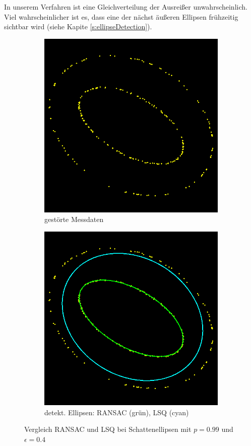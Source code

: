 In unserem Verfahren ist eine Gleichverteilung der Ausreißer unwahrscheinlich. Viel wahrscheinlicher ist es, dass eine der nächst äußeren Ellipsen frühzeitig sichtbar wird (siehe Kapite \ref{s:ellipseDetection}). 

\begin{figure}[!htb]
	\begin{subfigure}{.5\textwidth}
		\centering
		\includegraphics[width=.9\textwidth]{images/ransacShadow40_0.png}
		\caption{gestörte Messdaten}
	\end{subfigure}%
	\begin{subfigure}{.5\textwidth}
		\centering
		\includegraphics[width=.9\textwidth]{images/ransacShadow40_1.png}
		\caption{detekt. Ellipsen: RANSAC (grün), LSQ (cyan)}
	\end{subfigure}
	\caption{Vergleich RANSAC und LSQ bei Schattenellipsen mit $p = 0.99$ und $\epsilon = 0.4$}
	\label{fig:blubb}
\end{figure}


